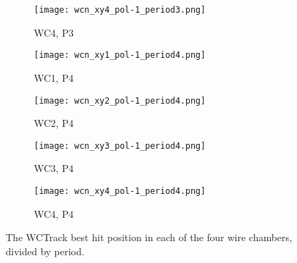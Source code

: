 \begin{figure}[h]
\begin{subfigure}[b]{0.23\textwidth}
            \centering
            \texttt{[image: wcn\_xy4\_pol-1\_period3.png]}
            \caption{WC4, P3}
            \label{fig_wc4_p3}
            \end{subfigure}
            \hfill
            \begin{subfigure}[b]{0.23\textwidth}
            \centering
            \texttt{[image: wcn\_xy1\_pol-1\_period4.png]}
            \caption{WC1, P4}
            \label{fig_wc1_p4}
            \end{subfigure}
            \hfill             
             \begin{subfigure}[b]{0.23\textwidth}
            \centering
            \texttt{[image: wcn\_xy2\_pol-1\_period4.png]}
            \caption{WC2, P4}
            \label{fig_wc2_p4}
            \end{subfigure}
            \hfill 
              \begin{subfigure}[b]{0.23\textwidth}
            \centering
            \texttt{[image: wcn\_xy3\_pol-1\_period4.png]}
            \caption{WC3, P4}
            \label{fig_wc3_p4}
            \end{subfigure}
            \hfill    
             \begin{subfigure}[b]{0.23\textwidth}
            \centering
            \texttt{[image: wcn\_xy4\_pol-1\_period4.png]}
            \caption{WC4, P4}
            \label{fig_wc4_p4}
            \end{subfigure}
            \hfill
   \caption[short]{The WCTrack best hit position in each of the four wire chambers, divided by period.}
   \label{fig_xyhitsperiod}
  \end{figure}
  
  
  
